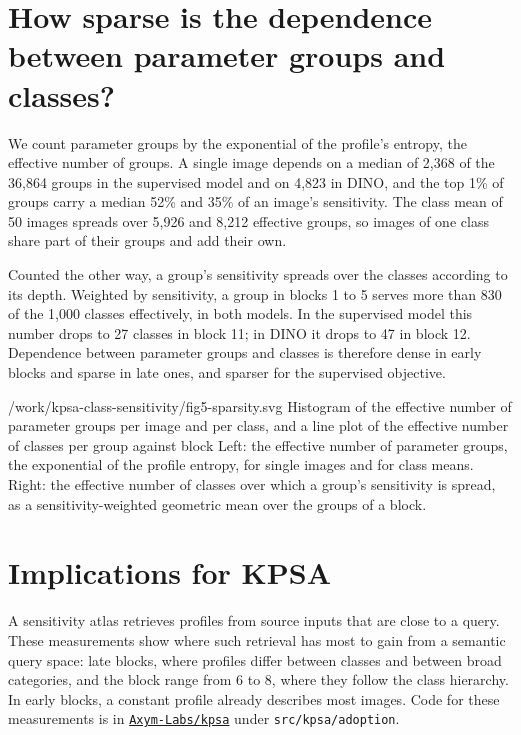 \documentclass[11pt]{article}
\begin{document}
\section{How sparse is the dependence between parameter groups and classes?}\label{sparsity}

We count parameter groups by the exponential of the profile's entropy, the effective number of groups. A single image depends on a median of 2,368 of the 36,864 groups in the supervised model and on 4,823 in DINO, and the top 1\% of groups carry a median 52\% and 35\% of an image's sensitivity. The class mean of 50 images spreads over 5,926 and 8,212 effective groups, so images of one class share part of their groups and add their own.

Counted the other way, a group's sensitivity spreads over the classes according to its depth. Weighted by sensitivity, a group in blocks 1 to 5 serves more than 830 of the 1,000 classes effectively, in both models. In the supervised model this number drops to 27 classes in block 11; in DINO it drops to 47 in block 12. Dependence between parameter groups and classes is therefore dense in early blocks and sparse in late ones, and sparser for the supervised objective.

  {/work/kpsa-class-sensitivity/fig5-sparsity.svg}
  {Histogram of the effective number of parameter groups per image and per class, and a line plot of the effective number of classes per group against block}
  {Left: the effective number of parameter groups, the exponential of the profile entropy, for single images and for class means. Right: the effective number of classes over which a group's sensitivity is spread, as a sensitivity-weighted geometric mean over the groups of a block.}

\section{Implications for KPSA}\label{implications}

A sensitivity atlas retrieves profiles from source inputs that are close to a query. These measurements show where such retrieval has most to gain from a semantic query space: late blocks, where profiles differ between classes and between broad categories, and the block range from 6 to 8, where they follow the class hierarchy. In early blocks, a constant profile already describes most images. Code for these measurements is in \href{https://github.com/Axym-Labs/kpsa}{\texttt{Axym-Labs/kpsa}} under \texttt{src/kpsa/adoption}.
\end{document}
